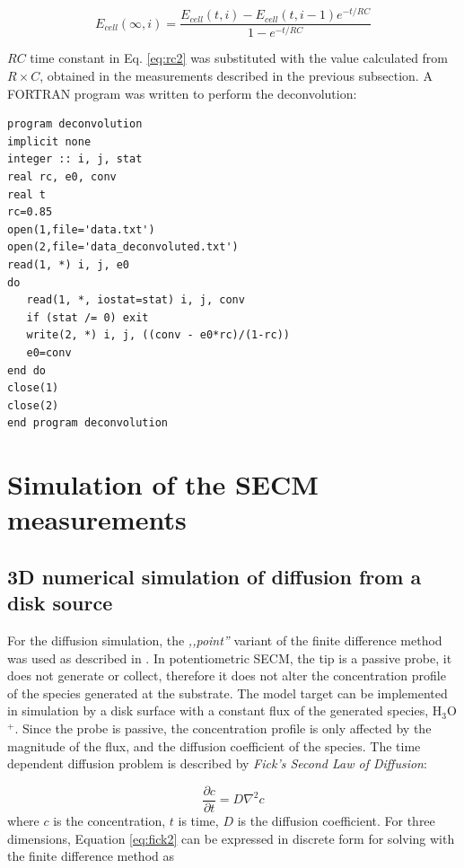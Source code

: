 \begin{equation}
\label{eq:rc3}
        E_{cell}(\infty, i)
        =
        \frac
                {E_{cell}(t, i) - E_{cell}(t, i-1)e^{-t/RC}}
                {1 - e^{-t/RC}}
\end{equation}

$RC$ time constant in Eq. \ref{eq:rc2} was substituted with the value calculated from $R\times C$, obtained in the measurements described in the previous subsection.
A FORTRAN program was written to perform the deconvolution:

\begin{lstlisting}
program deconvolution
implicit none
integer :: i, j, stat
real rc, e0, conv
real t
rc=0.85
open(1,file='data.txt')
open(2,file='data_deconvoluted.txt')
read(1, *) i, j, e0
do
   read(1, *, iostat=stat) i, j, conv
   if (stat /= 0) exit
   write(2, *) i, j, ((conv - e0*rc)/(1-rc))
   e0=conv
end do
close(1)
close(2)
end program deconvolution
\end{lstlisting}
	
	\section{Simulation of the SECM measurements}
		\subsection{3D numerical simulation of diffusion from a disk source}
For the diffusion simulation, the \emph{,,point''} variant of the finite difference method was used as described in \cite{britzdigital}.
In potentiometric SECM, the tip is a passive probe, it does not generate or collect, therefore it does not alter the concentration profile of the species generated at the substrate.
The model target can be implemented in simulation by a disk surface with a constant flux of the generated species, H$_3$O$^{+}$.
Since the probe is passive, the concentration profile is only affected by the magnitude of the flux, and the diffusion coefficient of the species.
The time dependent diffusion problem is described by \emph{Fick's Second Law of Diffusion}:

\begin{equation}
\label{eq:fick2}
        \frac
                {\partial c}
                {\partial t}
                =
                D
                \nabla^2c
\end{equation}
where $c$ is the concentration, $t$ is time, $D$ is the diffusion coefficient.
For three dimensions, Equation \ref{eq:fick2} can be expressed in discrete form for solving with the finite difference method as

